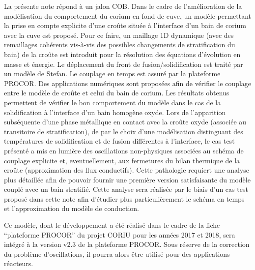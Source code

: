La présente note répond à un jalon COB. Dans le cadre de l’amélioration de la modélisation du comportement du corium en fond de cuve, un modèle permettant la prise en compte explicite d’une croûte située à l’interface d’un bain de
corium avec la cuve est proposé. Pour ce faire, un maillage 1D dynamique (avec des remaillages cohérents vis-à-vis des possibles changements de stratification du bain) de la croûte est introduit pour la résolution des équations d’évolution en masse et énergie. Le déplacement du front de fusion/solidification est traité par un modèle de Stefan. Le couplage en temps est assuré par la plateforme PROCOR. Des applications numériques sont proposées afin de vérifier le couplage entre le modèle de croûte et celui du bain de corium. Les résultats obtenus permettent de vérifier le bon comportement du modèle dans le cas de la solidification à l'interface d'un bain homogène oxyde. Lors de l'apparition  subséquente d'une phase métallique en contact avec la croûte oxyde (associée au transitoire de stratification), de par le choix d'une modélisation distinguant des températures de solidification et de fusion différentes à l'interface, le cas test présenté a mis en lumière des oscillations non-physiques associées au schéma de couplage explicite et, eventuellement, aux fermetures du bilan thermique de la croûte (approximation des flux conductifs). Cette pathologie requiert une analyse plus détaillée afin de pouvoir fournir une première version satisfaisante du modèle couplé avec un bain stratifié. Cette analyse sera réalisée par le biais d'un cas test proposé dans cette note afin d'étudier plus particulièrement le schéma en temps et l'approximation du modèle de conduction.

Ce modèle, dont le développement a été réalisé dans le cadre de la fiche ``plateforme PROCOR'' du projet CORIU pour les années 2017 et 2018, sera intégré à la version v2.3 de la plateforme PROCOR. Sous réserve de la correction du problème d'oscillations, il pourra alors être utilisé pour des applications réacteurs.
